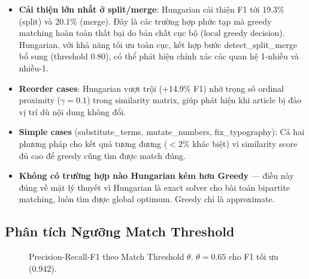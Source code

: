 \begin{itemize}
    \item \textbf{Cải thiện lớn nhất ở split/merge}: Hungarian cải thiện F1 tới 19.3\% (split) và 20.1\% (merge). Đây là các trường hợp phức tạp mà greedy matching hoàn toàn thất bại do bản chất cục bộ (local greedy decision). Hungarian, với khả năng tối ưu toàn cục, kết hợp bước detect\_split\_merge bổ sung (threshold 0.80), có thể phát hiện chính xác các quan hệ 1-nhiều và nhiều-1.

    \item \textbf{Reorder cases}: Hungarian vượt trội (+14.9\% F1) nhờ trọng số ordinal proximity ($\gamma=0.1$) trong similarity matrix, giúp phát hiện khi article bị đảo vị trí dù nội dung không đổi.

    \item \textbf{Simple cases} (substitute\_terms, mutate\_numbers, fix\_typography): Cả hai phương pháp cho kết quả tương đương ($< 2\%$ khác biệt) vì similarity score đủ cao để greedy cũng tìm được match đúng.

    \item \textbf{Không có trường hợp nào Hungarian kém hơn Greedy} — điều này đúng về mặt lý thuyết vì Hungarian là exact solver cho bài toán bipartite matching, luôn tìm được global optimum. Greedy chỉ là approximate.
\end{itemize}

\subsection{Phân tích Ngưỡng Match Threshold}

\begin{figure}[H]
    \centering
    \caption{Precision-Recall-F1 theo Match Threshold $\theta$. $\theta = 0.65$ cho F1 tối ưu (0.942).}
    \label{fig:threshold_curve}
\end{figure}

